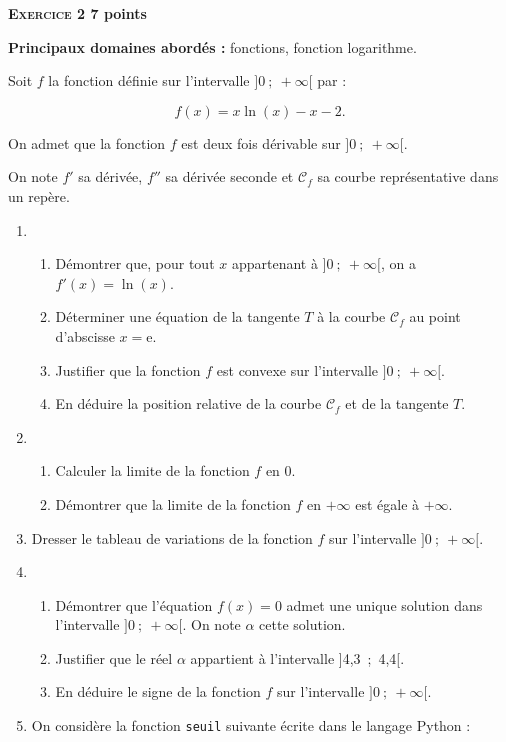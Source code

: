 \documentclass[10pt,a4paper]{article}
\begin{document}
\bigskip

\textbf{\textsc{Exercice 2} \hfill 7 points}

\textbf{Principaux domaines abordés :} fonctions, fonction logarithme.

\medskip

Soit $f$ la fonction définie sur l'intervalle $]0~;~+\infty[$ par :

\[f(x) = x \ln (x) - x - 2.\]

On admet que la fonction $f$ est deux fois dérivable sur $]0~;~+\infty[$.

On note $f'$ sa dérivée, $f''$ sa dérivée seconde et $\mathcal{C}_f$ sa courbe représentative dans un repère.

\medskip

\begin{enumerate}
\item 
	\begin{enumerate}
		\item Démontrer que, pour tout $x$ appartenant à $]0~;~+\infty[$, on a $f'(x) = \ln (x)$.
		\item Déterminer une équation de la tangente $T$ à la courbe $\mathcal{C}_f$ au point
d'abscisse $x = $e.
		\item Justifier que la fonction $f$ est convexe sur l'intervalle $]0~;~+\infty[$.
		\item En déduire la position relative de la courbe $\mathcal{C}_f$ et de la tangente $T$.
	\end{enumerate}	
\item 
	\begin{enumerate}
		\item Calculer la limite de la fonction $f$ en $0$.
		\item Démontrer que la limite de la fonction $f$ en $+\infty$ est égale à $+\infty$.
	\end{enumerate}
\item Dresser le tableau de variations de la fonction $f$ sur l'intervalle $]0~;~+\infty[$.
\item 
	\begin{enumerate}
		\item Démontrer que l'équation $f(x) = 0$ admet une unique solution dans
l'intervalle $]0~;~+\infty[$. On note $\alpha$ cette solution.
		\item Justifier que le réel $\alpha$ appartient à l'intervalle ]4,3~;~4,4[.
		\item En déduire le signe de la fonction $f$ sur l'intervalle $]0~;~+\infty[$.
	\end{enumerate}	
\item On considère la fonction \texttt{seuil} suivante écrite dans le langage Python :


\end{enumerate}
\end{document}
